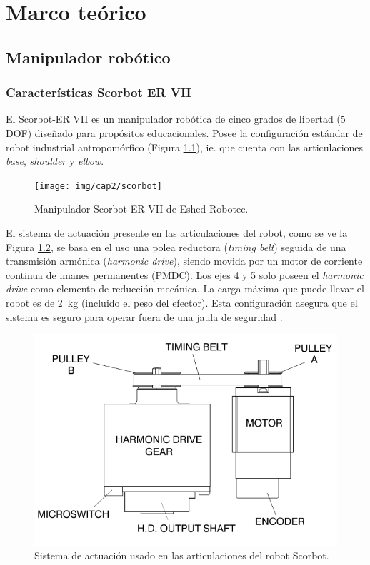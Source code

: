 \chapter{Marco teórico}

\section{Manipulador robótico}

\subsection{Características Scorbot ER VII}

El Scorbot-ER VII es un  manipulador robótica de cinco grados de libertad (5 DOF) diseñado para propósitos educacionales. Posee la configuración estándar de robot industrial antropomórfico (Figura \ref{cap2_scorbot}), ie. que cuenta con las articulaciones \textit{base}, \textit{shoulder} y \textit{elbow}.

\begin{figure}[ht]
  \centering
  \texttt{[image: img/cap2/scorbot]}
  \caption{Manipulador Scorbot ER-VII de Eshed Robotec.}
  \label{cap2_scorbot}
\end{figure}

El sistema de actuación presente en las articulaciones del robot, como se ve la Figura \ref{cap2_scorbot_drive}, se basa en el uso una polea reductora (\textit{timing belt}) seguida de una  transmisión armónica (\textit{harmonic drive}), siendo movida por un motor de corriente continua de imanes permanentes (PMDC). Los ejes 4 y 5 solo poseen el \textit{harmonic drive} como elemento de reducción mecánica. La carga máxima que puede llevar el robot es de \SI{2}{\kilo\gram} (incluido el peso del efector). Esta configuración asegura que el sistema es seguro para operar fuera de una jaula de seguridad \cite{scorbot1998}.

\begin{figure}[ht]
	\centering
	\includegraphics[scale=0.5]{img/cap2/scorbot_drive}
	\caption{Sistema de actuación usado en las articulaciones del robot Scorbot.}
	\label{cap2_scorbot_drive}
\end{figure}

